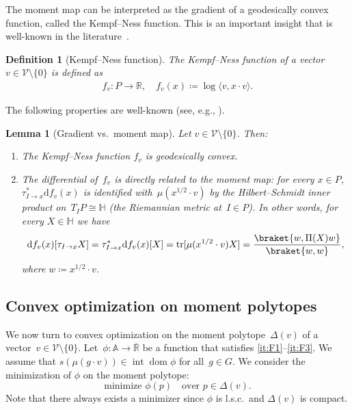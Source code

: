\documentclass[11pt,letterpaper]{article}
\newtheorem{definition}[theorem]{Definition}\AddToHook{env/definition/begin}{\crefalias{theorem}{definition}}
\newtheorem{lemma}[theorem]{Lemma}\AddToHook{env/lemma/begin}{\crefalias{theorem}{lemma}}
\numberwithin{equation}{section}
\renewcommand{\AA}{\mathbb{A}}
\newcommand{\RR}{\mathbb{R}}
\newcommand{\bbH}{\mathbb{H}}
\newcommand{\diff}{\mathrm{d}}
\newcommand{\VV}{\mathcal{V}}
\DeclareMathOperator{\intr}{int}
\DeclareMathOperator{\dom}{dom}
\DeclareMathOperator{\tr}{tr}
\newcommand{\minproblem}[2]{\text{minimize } #1 \quad \text{over } #2}
\begin{document}
The moment map can be interpreted as the gradient of a geodesically convex function, called the Kempf--Ness function.
This is an important insight that is well-known in the literature~\cite{Kempf-78,NessMumford1984,Kirwan1984}.

\begin{definition}[Kempf--Ness function]
The Kempf--Ness function of a vector $v \in \VV\setminus\{0\}$ is defined as
\begin{align}\label{eq:kn}
    f_v \colon P \to \RR, \quad f_v(x) \coloneqq \log\langle v, x\cdot v\rangle.
\end{align}
\end{definition}

The following properties are well-known (see, e.g., \cite{BFGOWW2019,HiraiSakabe2024}).

\begin{lemma}[Gradient vs.\ moment map]\label{lem:KNderivative}
    Let $v \in \VV\setminus\{0\}$. Then:
    \begin{enumerate}
        \item[(a)] The Kempf--Ness function $f_v$ is geodesically convex.
        \item[(b)] The differential of~$f_v$ is directly related to the moment map:
        for every $x\in P$, $\tau^*_{I \to x}\diff f_v(x)$ is identified with~$\mu(x^{1/2}\cdot v)$ by the Hilbert--Schmidt inner product on~$T_I P \cong \bbH$ (the Riemannian metric at~$I \in P$).
        In other words, for every $X \in \bbH$ we have
        \[
            \diff f_v(x)[\tau_{I \to x} X]
        = \tau^*_{I \to x}\diff f_v(x)[X]
        = \tr[ \mu(x^{1/2}\cdot v) X]
        = \frac {\braket{w, \Pi(X) w}} {\braket{w, w}},
        \]
        where $w\coloneqq x^{1/2}\cdot v$.
    \end{enumerate}
\end{lemma}

\subsection{Convex optimization on moment polytopes}\label{sub:convex_optimization_on_moment_polytopes}
We now turn to convex optimization on the moment polytope~$\Delta(v)$ of a vector~$v\in\VV\setminus\{0\}$.
Let~$\phi \colon \AA \to \overline{\RR}$ be a function that satisfies \ref{it:F1}--\ref{it:F3}.
We assume that $s(\mu(g\cdot v)) \in \intr\dom\phi$ for all~$g \in G$.
We consider the minimization of $\phi$ on the moment polytope:
\begin{equation}\label{eq:min_over_momentpolytope}
    \minproblem{\phi(p)}{p \in \Delta(v)}.
\end{equation}
Note that there always exists a minimizer since $\phi$ is l.s.c.\ and $\Delta(v)$ is compact.
\end{document}
